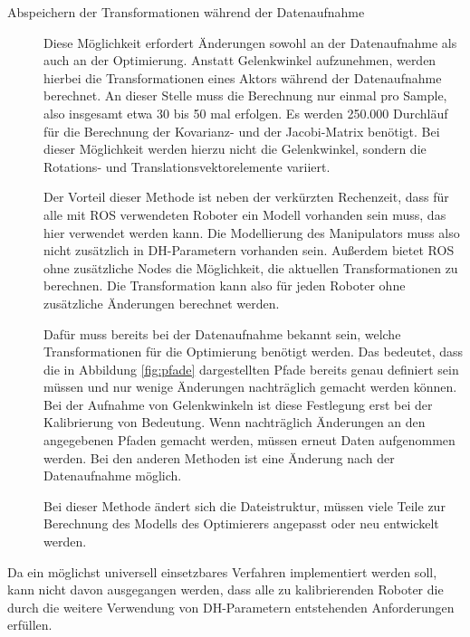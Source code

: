 \begin{description}
  \item[Abspeichern der Transformationen während der Datenaufnahme] %
    \label{ssub:Abspeichern der Transformationen während der Datenaufnahme}


    Diese Möglichkeit erfordert Änderungen sowohl an der Datenaufnahme als auch an der Optimierung.
    Anstatt Gelenkwinkel aufzunehmen, werden hierbei die Transformationen eines Aktors während der Datenaufnahme
    berechnet. An dieser Stelle muss die Berechnung nur einmal pro Sample, also insgesamt etwa 30 bis 50 mal 
    erfolgen. Es werden 250.000 Durchläuf für die Berechnung der Kovarianz- und
    der Jacobi-Matrix benötigt. Bei dieser Möglichkeit werden hierzu nicht die Gelenkwinkel,
    sondern die Rotations- und Translationsvektorelemente variiert.

    Der Vorteil dieser Methode ist neben der verkürzten Rechenzeit, dass für alle mit \ac{ROS} verwendeten 
    Roboter ein Modell vorhanden sein muss, das hier verwendet werden kann. Die Modellierung des Manipulators
    muss also nicht zusätzlich in \ac{DH-Parameter}n vorhanden sein. Außerdem 
    bietet \ac{ROS} ohne zusätzliche Nodes die Möglichkeit, die aktuellen Transformationen
    zu berechnen. Die Transformation kann also für jeden Roboter ohne zusätzliche
    Änderungen berechnet werden.

    Dafür muss bereits bei der Datenaufnahme bekannt sein, welche Transformationen für die Optimierung benötigt 
    werden. Das bedeutet, dass die in Abbildung \ref{fig:pfade} dargestellten Pfade bereits genau
    definiert sein müssen und nur wenige Änderungen nachträglich gemacht werden können. Bei der 
    Aufnahme von Gelenkwinkeln ist diese Festlegung erst bei der Kalibrierung von Bedeutung. 
    Wenn nachträglich Änderungen an den angegebenen Pfaden gemacht werden, müssen 
    erneut Daten aufgenommen werden. Bei den anderen Methoden ist eine Änderung nach
    der Datenaufnahme möglich.

    Bei dieser Methode ändert sich die Dateistruktur, müssen viele Teile zur 
    Berechnung des Modells des Optimierers angepasst oder neu entwickelt werden. 
\end{description}


Da ein möglichst universell einsetzbares Verfahren implementiert werden soll, 
kann nicht davon ausgegangen werden, dass alle zu kalibrierenden Roboter die 
durch die weitere Verwendung von \ac{DH-Parameter}n entstehenden Anforderungen
erfüllen. 

